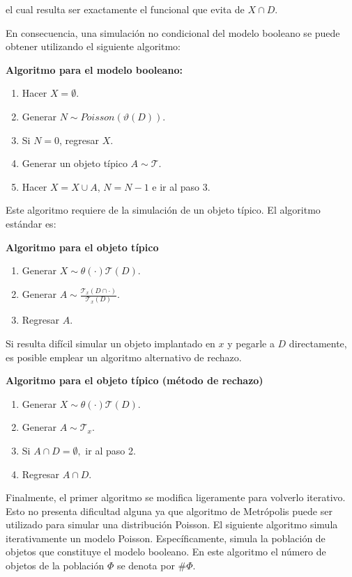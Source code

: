 el cual resulta ser exactamente el funcional que evita de $X\cap D$.

En consecuencia, una simulaci\'on no condicional del modelo booleano se puede obtener utilizando el siguiente algoritmo:

\textbf{Algoritmo para el modelo booleano:}
\begin{enumerate}
\item Hacer $X=\emptyset$.
\item Generar $N\sim Poisson(\vartheta(D))$.
\item Si $N=0$, regresar $X$.
\item Generar un objeto t\'ipico $A\sim\mathcal{T}$.
\item Hacer $X=X\cup A$, $N=N-1$ e ir al paso 3.
\end{enumerate}

Este algoritmo requiere de la simulaci\'on de un objeto t\'ipico. El algoritmo est\'andar es:

\textbf{Algoritmo para el objeto t\'ipico}
\begin{enumerate}
\item Generar $X\sim \theta(\cdot)\mathcal{T}(D)$.
\item Generar $A\sim \frac{\mathcal{T}_x(D\cap\cdot)}{\mathcal{T}_x(D)}$.
\item Regresar $A$.
\end{enumerate}

Si resulta dif\'icil simular un objeto implantado en $x$ y pegarle a $D$ directamente, es posible emplear un algoritmo alternativo de rechazo.

\textbf{Algoritmo para el objeto t\'ipico (m\'etodo de rechazo)}
\begin{enumerate}
\item Generar $X\sim \theta(\cdot)\mathcal{T}(D)$.
\item Generar $A\sim \mathcal{T}_x$.
\item Si $A\cap D=\emptyset,$ ir al paso 2.
\item Regresar $A\cap D$.
\end{enumerate}

Finalmente, el primer algoritmo se modifica ligeramente para volverlo iterativo. Esto no presenta dificultad alguna ya que algoritmo de Metr\'opolis puede ser utilizado para simular una distribuci\'on Poisson. El siguiente algoritmo simula iterativamente un modelo Poisson. Espec\'ificamente, simula la poblaci\'on de objetos que constituye el modelo booleano. En este algoritmo el n\'umero de objetos de la poblaci\'on $\Phi$ se denota por $\#\Phi$.



